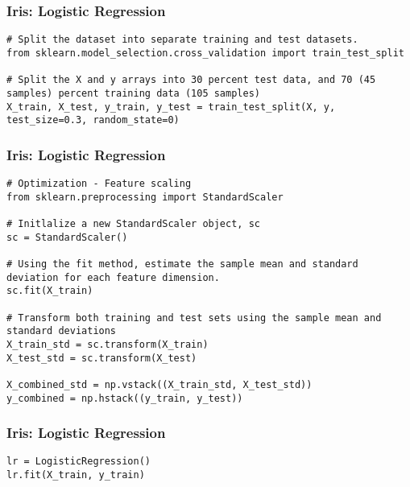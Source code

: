 \begin{frame}[fragile]\frametitle{Iris: Logistic Regression}
\begin{lstlisting}
# Split the dataset into separate training and test datasets.
from sklearn.model_selection.cross_validation import train_test_split

# Split the X and y arrays into 30 percent test data, and 70 (45 samples) percent training data (105 samples)
X_train, X_test, y_train, y_test = train_test_split(X, y, test_size=0.3, random_state=0)
\end{lstlisting}

\end{frame}

\begin{frame}[fragile]\frametitle{Iris: Logistic Regression}
\begin{lstlisting}
# Optimization - Feature scaling
from sklearn.preprocessing import StandardScaler

# Initlalize a new StandardScaler object, sc
sc = StandardScaler()

# Using the fit method, estimate the sample mean and standard deviation for each feature dimension. 
sc.fit(X_train)

# Transform both training and test sets using the sample mean and standard deviations
X_train_std = sc.transform(X_train)
X_test_std = sc.transform(X_test)

X_combined_std = np.vstack((X_train_std, X_test_std))
y_combined = np.hstack((y_train, y_test))
\end{lstlisting}

\end{frame}

\begin{frame}[fragile]\frametitle{Iris: Logistic Regression}
\begin{lstlisting}
lr = LogisticRegression()
lr.fit(X_train, y_train)

\end{lstlisting}

\end{frame}


